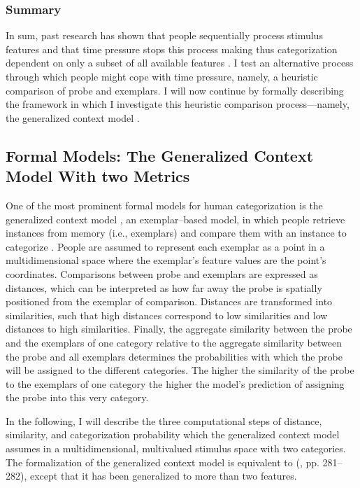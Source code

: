 \documentclass[a4paper,man,natbib]{apa6}
\begin{document}
\subsubsection{Summary}
In sum, past research has shown that people sequentially process stimulus features and that time pressure stops this process making thus categorization dependent on only a subset of all available features \citep{lamberts1995categorization, lamberts1998time, lamberts1999building, lamberts1999categorization, lamberts1997fast}. I test an alternative process through which people might cope with time pressure, namely, a heuristic comparison of probe and exemplars. I will now continue by formally describing the framework in which I investigate this heuristic comparison process---namely, the generalized context model \citep{nosofsky1986attention}.

\subsection{Formal Models: The Generalized Context Model With two Metrics}
One of the most prominent formal models for human categorization is the generalized context model \citep{nosofsky1984choice, nosofsky1986attention, nosofsky2011generalized}, an exemplar--based model, in which people retrieve instances from memory (i.e., exemplars) and compare them with an instance to categorize \citep[i.e., the probe; see also][]{medin1978context}. People are assumed to represent each exemplar as a point in a multidimensional space where the exemplar's feature values are the point's coordinates. Comparisons between probe and exemplars are expressed as distances, which can be interpreted as how far away the probe is spatially positioned from the exemplar of comparison. Distances are transformed into similarities, such that high distances correspond to low similarities and low distances to high similarities. Finally, the aggregate similarity between the probe and the exemplars of one category relative to the aggregate similarity between the probe and all exemplars determines the probabilities with which the probe will be assigned to the different categories. The higher the similarity of the probe to the exemplars of one category the higher the model's prediction of assigning the probe into this very category. 

In the following, I will describe the three computational steps of distance, similarity, and categorization probability which the generalized context model assumes in a multidimensional, multivalued stimulus space with two categories. The formalization of the generalized context model is equivalent to \citeauthor{nosofsky1989further} (\citeyear{nosofsky1989further}, pp. 281--282), except that it has been generalized to more than two features. 
\end{document}
